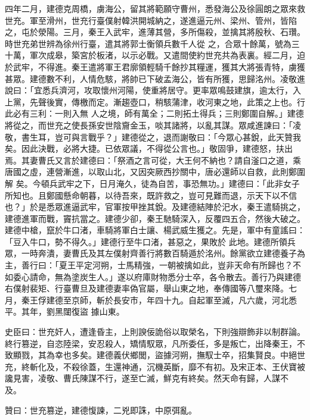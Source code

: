 \begin{pinyinscope}
 四年二月，建德克周橋，虜海公，留其將範願守曹州，悉發海公及徐圓朗之眾來救世充。軍至滑州，世充行臺僕射韓洪開城納之，遂進逼元州、梁州、管州，皆陷之，屯於滎陽。三月，秦王入武牢，進薄其營，多所傷殺，並擒其將殷秋、石瓚。時世充弟世辨為徐州行臺，遣其將郭士衡領兵數千人從
 之，合眾十餘萬，號為三十萬，軍次成皋，築宮於板渚，以示必戰。又遣間使約世充共為表裏。經二月，迫於武牢，不得進。秦王遣將軍王君廓領輕騎千餘抄其糧運，獲其大將張青特，虜獲甚眾。建德數不利，人情危駭，將帥已下破孟海公，皆有所獲，思歸洺州。凌敬進說曰：「宜悉兵濟河，攻取懷州河陽，使重將居守。更率眾鳴鼓建旗，逾太行，入上黨，先聲後實，傳檄而定。漸趨壺口，稍駭蒲津，收河東之地，此策之上也。行此必有三利：一則入無
 人之境，師有萬全；二則拓土得兵；三則鄭圍自解。」建德將從之，而世充之使長孫安世陰齎金玉，啖其諸將，以亂其謀。眾咸進諫曰：「凌敬，書生耳，豈可與言戰乎？」建德從之，退而謝敬曰：「今眾心甚銳，此天贊我矣。因此決戰，必將大捷。已依眾議，不得從公言也。」敬固爭，建德怒，扶出焉。其妻曹氏又言於建德曰：「祭酒之言可從，大王何不納也？請自滏口之道，乘唐國之虛，連營漸進，以取山北，又因突厥西抄關中，唐必還師以自救，此則鄭圍解
 矣。今頓兵武牢之下，日月淹久，徒為自苦，事恐無功。」建德曰：「此非女子所知也。且鄭國懸命朝暮，以待吾來，既許救之，豈可見難而退，示天下以不信也？」於是悉眾進逼武牢，官軍按甲挫其銳。及建德結陣於汜水，秦王遣騎挑之，建德進軍而戰，竇抗當之。建德少卻，秦王馳騎深入，反覆四五合，然後大破之。建德中槍，竄於牛口渚，車騎將軍白士讓、楊武威生獲之。先是，軍中有童謠曰：「豆入牛口，勢不得久。」建德行至牛口渚，甚惡之，果敗於
 此地。建德所領兵眾，一時奔潰，妻曹氏及其左僕射齊善行將數百騎遁於洺州。餘黨欲立建德養子為主，善行曰：「夏王平定河朔，士馬精強，一朝被擒如此，豈非天命有所歸也？不如委心請命，無為塗炭生人。」遂以府庫財物悉分士卒，各令散去。善行乃與建德右僕射裴矩、行臺曹旦及建德妻率偽官屬，舉山東之地，奉傳國等八璽來降。七月，秦王俘建德至京師，斬於長安市，年四十九。自起軍至滅，凡六歲，河北悉平。其年，劉黑闥復盜
 據山東。



 史臣曰：世充奸人，遭逢昏主，上則諛佞詭俗以取榮名，下則強辯飾非以制群論。終行篡逆，自恣陸梁，安忍殺人，矯情馭眾，凡所委任，多是叛亡，出降秦王，不致顯戮，其為幸也多矣。建德義伏鄉閭，盜據河朔，撫馭士卒，招集賢良。中絕世充，終斬化及，不殺徐蓋，生還神通，沉機英斷，靡不有初。及宋正本、王伏寶被讒見害，凌敬、曹氏陳謀不行，遂至亡滅，鮮克有終矣。然天命有歸，人謀不
 及。



 贊曰：世充篡逆，建德愎諫，二兇即誅，中原弭亂。



\end{pinyinscope}
